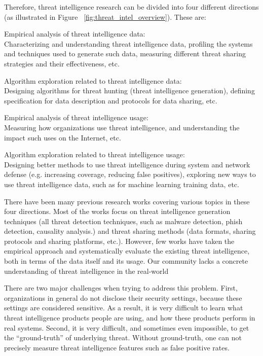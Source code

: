 Therefore, threat intelligence research can be divided into four 
different directions (as illustrated in Figure
~\ref{fig:threat_intel_overview}). These are:
\begin{prettylist}
    \item Empirical analysis of threat intelligence data: \\
    Characterizing and understanding threat intelligence data, profiling the 
    systems and techniques used to generate such data, measuring different 
    threat sharing strategies and their effectiveness, etc.
    
    \item Algorithm exploration related to threat intelligence data: \\
    Designing algorithms for threat hunting (threat intelligence generation),
    defining specification for data description and protocols for data 
    sharing, etc.
    
    \item Empirical analysis of threat intelligence usage: \\
    Measuring how organizations use threat intelligence, and understanding
    the impact such uses on the Internet, etc.
    
    \item Algorithm exploration related to threat intelligence usage: \\
    Designing better methods to use threat intelligence during system and 
    network defense (e.g. increasing coverage, reducing false positives),
    exploring new ways to use threat intelligence data, such as for machine
    learning training data, etc.
\end{prettylist}

There have been many previous research works covering various topics in these
four directions. Most of the works focus on threat intelligence generation
techniques (all threat detection techniques, such as malware detection, phish 
detection, causality analysis.) and threat sharing methods (data formats, 
sharing protocols and sharing platforms, etc.). However, few works have taken
the empirical approach and systematically evaluate the existing threat
intelligence, both in terms of the data itself and its usage. Our community 
lacks a concrete understanding of threat intelligence in the real-world

There are two major challenges when trying to address this problem. First, 
organizations in general do not disclose their security settings, because 
these settings are considered sensitive. As a result, it is very difficult 
to learn what threat intelligence products people are using, and 
how these products perform in real systems. Second, it is very difficult, 
and sometimes even impossible, to get the ``ground-truth'' of underlying 
threat. Without ground-truth, one can not precisely measure threat 
intelligence features such as false positive rates.

